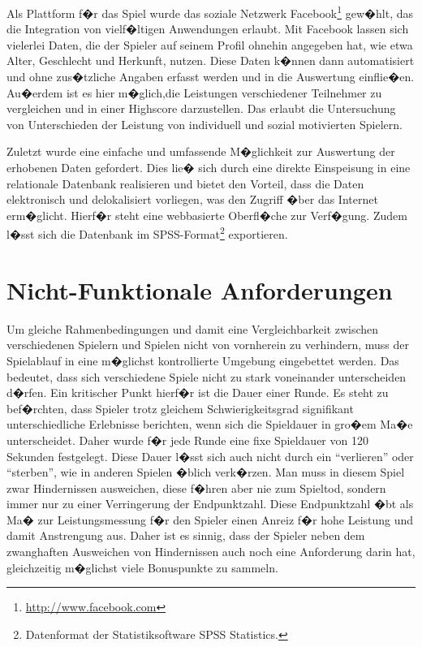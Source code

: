 \documentclass[a4paper,12pt]{scrartcl}
\begin{document}
Als Plattform f�r das Spiel wurde das soziale Netzwerk Facebook\footnote{\url{http://www.facebook.com}} gew�hlt, das die
Integration von vielf�ltigen Anwendungen erlaubt. Mit Facebook lassen sich vielerlei Daten,
die der Spieler auf seinem Profil ohnehin angegeben hat, wie etwa Alter, Geschlecht und
Herkunft, nutzen. Diese Daten k�nnen dann automatisiert und ohne zus�tzliche Angaben
erfasst werden und in die Auswertung einflie�en.\newline
Au�erdem ist es hier m�glich,die Leistungen verschiedener Teilnehmer zu vergleichen
und in einer Highscore darzustellen. Das erlaubt die Untersuchung von Unterschieden der
Leistung von individuell und sozial motivierten Spielern.

Zuletzt wurde eine einfache und umfassende M�glichkeit zur Auswertung der erhobenen Daten gefordert.
Dies lie� sich durch eine direkte Einspeisung in eine relationale Datenbank realisieren und bietet den Vorteil, dass die Daten elektronisch und delokalisiert vorliegen, was den Zugriff �ber das Internet erm�glicht. Hierf�r steht eine webbasierte Oberfl�che zur Verf�gung. Zudem l�sst sich die Datenbank im SPSS-Format\footnote{Datenformat der Statistiksoftware SPSS Statistics.} exportieren.

\section{Nicht-Funktionale Anforderungen}
Um gleiche Rahmenbedingungen und damit eine Vergleichbarkeit zwischen verschiedenen
Spielern und Spielen nicht von vornherein zu verhindern, muss der Spielablauf in
eine m�glichst kontrollierte Umgebung eingebettet werden. Das bedeutet, dass sich
verschiedene Spiele nicht zu stark voneinander unterscheiden d�rfen. Ein kritischer Punkt
hierf�r ist die Dauer einer Runde. Es steht zu bef�rchten, dass Spieler trotz gleichem
Schwierigkeitsgrad signifikant unterschiedliche Erlebnisse berichten, wenn sich die
Spieldauer in gro�em Ma�e unterscheidet. Daher wurde f�r jede Runde eine fixe Spieldauer
von 120 Sekunden festgelegt. Diese Dauer l�sst sich auch nicht durch ein "`verlieren"'
oder "`sterben"', wie in anderen Spielen �blich verk�rzen. Man muss in diesem Spiel zwar
Hindernissen ausweichen, diese f�hren aber nie zum Spieltod, sondern immer nur zu einer
Verringerung der Endpunktzahl. Diese Endpunktzahl �bt als Ma� zur Leistungsmessung f�r
den Spieler einen Anreiz f�r hohe Leistung und damit Anstrengung aus. Daher ist es
sinnig, dass der Spieler neben dem zwanghaften Ausweichen von Hindernissen auch noch
eine Anforderung darin hat, gleichzeitig m�glichst viele Bonuspunkte zu sammeln.
\end{document}
